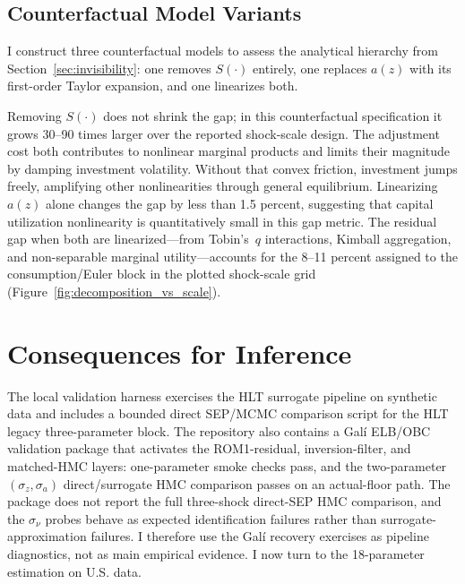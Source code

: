 \documentclass[12pt]{article}
\theoremstyle{plain}
\theoremstyle{definition}
\theoremstyle{remark}
\begin{document}
\subsection{Counterfactual Model Variants}
\label{subsec:counterfactuals}

I construct three counterfactual models to assess the analytical hierarchy from Section~\ref{sec:invisibility}: one removes $S(\cdot)$ entirely, one replaces $a(z)$ with its first-order Taylor expansion, and one linearizes both.

Removing $S(\cdot)$ does not shrink the gap; in this counterfactual specification it grows 30--90 times larger over the reported shock-scale design. The adjustment cost both contributes to nonlinear marginal products and limits their magnitude by damping investment volatility. Without that convex friction, investment jumps freely, amplifying other nonlinearities through general equilibrium. Linearizing $a(z)$ alone changes the gap by less than 1.5 percent, suggesting that capital utilization nonlinearity is quantitatively small in this gap metric. The residual gap when both are linearized---from Tobin's~$q$ interactions, Kimball aggregation, and non-separable marginal utility---accounts for the 8--11 percent assigned to the consumption/Euler block in the plotted shock-scale grid (Figure~\ref{fig:decomposition_vs_scale}).



\section{Consequences for Inference}
\label{sec:inference_consequences}

The local validation harness exercises the HLT surrogate pipeline on synthetic data and includes a bounded direct SEP/MCMC comparison script for the HLT legacy three-parameter block. The repository also contains a Gal\'i ELB/OBC validation package that activates the ROM1-residual, inversion-filter, and matched-HMC layers: one-parameter smoke checks pass, and the two-parameter $(\sigma_z,\sigma_a)$ direct/surrogate HMC comparison passes on an actual-floor path. The package does not report the full three-shock direct-SEP HMC comparison, and the $\sigma_\nu$ probes behave as expected identification failures rather than surrogate-approximation failures. I therefore use the Gal\'i recovery exercises as pipeline diagnostics, not as main empirical evidence. I now turn to the 18-parameter estimation on U.S. data.
\end{document}
